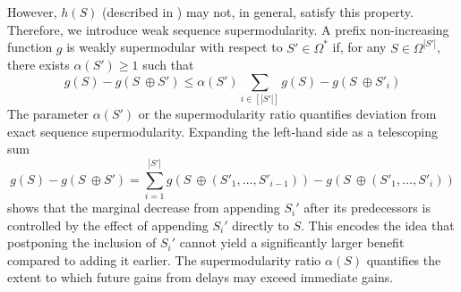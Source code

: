 \documentclass{article} %
\begin{document}
However, $h(S)$ (described in ) may not, in general, satisfy this property. Therefore, we introduce weak sequence supermodularity. A prefix non-increasing function $g$ is weakly supermodular with respect to $S' \in \Omega^*$ if, for any $S \in \Omega^{|S'|}$, there exists $\alpha(S') \geq 1$ such that
\begin{equation}\label{eqn:alpha_supermod}
     g(S) - g(S\ \oplus S') \leq \alpha(S') \sum_{i \in [|S'|]} g(S) - g(S \ \oplus S'_i)
\end{equation}
The parameter $\alpha(S')$ or the supermodularity ratio quantifies deviation from exact sequence supermodularity.
Expanding the left-hand side as a telescoping sum $$g(S) - g(S\ \oplus S')=\sum_{i = 1}^{|S'|} g(S \ \oplus \left(S'_1, \dots, S'_{i - 1}\right)) - g(S \ \oplus \left(S'_1, \dots, S'_{i}\right))$$ 
shows that the marginal decrease from appending $S_i'$ after its predecessors
is controlled by the effect of appending $S_i'$ directly to $S$. This encodes the idea that postponing the inclusion of $S_i'$ cannot yield a significantly larger benefit compared to adding it earlier. The supermodularity ratio $\alpha(S)$ quantifies the extent to which future gains from delays may exceed immediate gains. 

\end{document}
